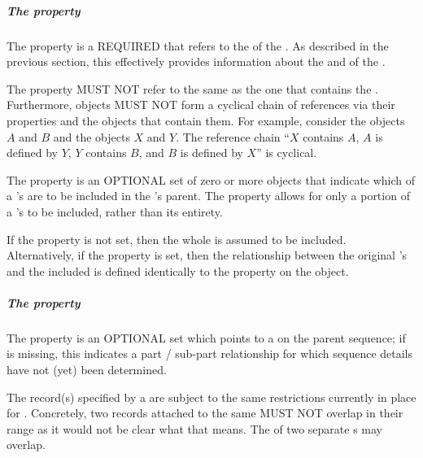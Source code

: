 \subparagraph{The  property}
\label{sec:instanceOf}

The  property is a REQUIRED  that refers to the  of the .
As described in the previous section, this  effectively provides information about the  and  of the .

The  property MUST NOT refer to the same  as the one that contains the .
Furthermore,  objects MUST NOT form a cyclical chain of references via their  properties and the  objects that contain them.
For example, consider the  objects $A$ and $B$ and the  objects $X$ and $Y$. The reference chain ``$X$ contains $A$, $A$ is defined by $Y$, $Y$ contains $B$, and $B$ is defined by $X$'' is cyclical.

The  property is an OPTIONAL set of zero or more  objects that indicate which  of a 's  are to be included in the 's parent. The  property
allows for only a portion of a 's  to be included, rather than its entirety.

If the  property is not set, then the whole  is assumed to be included. Alternatively,
if the  property is set, then the relationship between the original 's
 and the included  is defined identically to the 
property on the  object.


\subparagraph{The  property}\label{sec:location}
The  property is an OPTIONAL set which points to a  on the parent  sequence; if  is missing, this indicates a part / sub-part relationship for which sequence details have not (yet) been determined.

The  record(s) specified by a  are subject to the same restrictions currently in place for  . Concretely, two  records attached to the same  MUST NOT overlap in their range as it would not be clear what that means. The  of two separate s may overlap.

